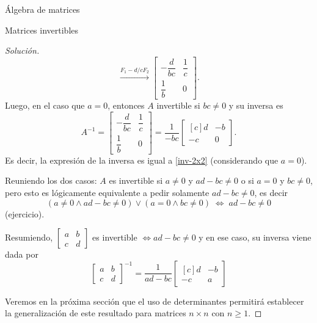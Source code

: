 \begin{chapter}{\'Algebra de matrices}
\begin{section}{Matrices invertibles}
\begin{proof}[Solución]
\begin{equation*}
                \stackrel{F_1 - d/c F_2}{\longrightarrow}
                \begin{bmatrix}-\dfrac{d}{bc}&\dfrac{1}{c}\\[6pt]\dfrac{1}{b}&0\end{bmatrix}.
                \end{equation*}  
                Luego, en el caso  que $a=0$, entonces $A$ invertible si  $b c\not=0$ y su inversa es
                \begin{equation*}
                A^{-1} = \begin{bmatrix}-\dfrac{d}{bc}&\dfrac{1}{c}\\[6pt]\dfrac{1}{b}&0\end{bmatrix} = 
                \dfrac{1}{-bc}
                \begin{bmatrix*}[c]d&-b\\-c&0\end{bmatrix*}.
                \end{equation*}
                Es decir, la expresión de la inversa es igual a \eqref{inv-2x2} (considerando que  $a=0$).
                
                Reuniendo los dos casos:  $A$ es invertible si $a\not=0$ y  $ad-bc\not=0$ o si $a=0$ y $bc\not=0$, pero esto es lógicamente equivalente a pedir solamente  $ad-bc\not=0$, es decir
                \begin{equation*}
                (a\not=0 \wedge ad-bc\not=0) \vee (a=0 \wedge bc\not=0)\; \Leftrightarrow\; ad-bc\not=0
                \end{equation*}
                (ejercicio).
                
                Resumiendo, $\begin{bmatrix*} a&b\\c&d\end{bmatrix*}$ es invertible  $\Leftrightarrow ad-bc\not=0$  y en ese caso,  su inversa viene dada por 
                \begin{equation}
                \begin{bmatrix*} a&b\\c&d\end{bmatrix*}^{-1} =  \dfrac{1}{ad-bc}
                \begin{bmatrix*}[c]d&-b\\-c&a\end{bmatrix*}
                \end{equation} 

                Veremos en la próxima sección que el uso de determinantes permitirá establecer la generalización de este resultado para matrices $n \times n$ con $n\ge 1$.
                

\end{proof}
\end{section}
\end{chapter}
